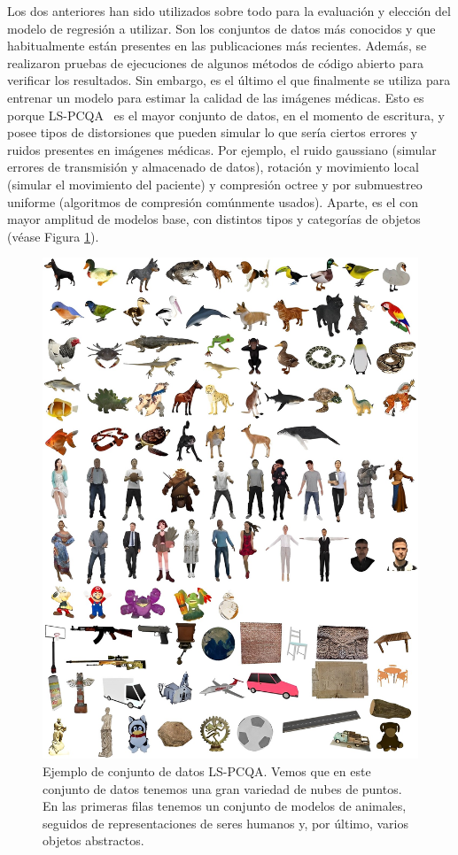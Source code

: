 Los dos anteriores han sido utilizados sobre todo para la evaluación y elección 
del modelo de regresión a utilizar. Son los conjuntos de datos más conocidos 
y que habitualmente están presentes en las publicaciones más recientes. Además, se realizaron 
pruebas de ejecuciones de algunos métodos de código abierto para verificar los 
resultados. Sin embargo, es el último el que finalmente se utiliza para entrenar un modelo para estimar 
la calidad de las imágenes médicas. Esto es porque LS-PCQA~\cite{ResSCNN} 
es el mayor conjunto de datos, en el momento de escritura, y posee tipos de distorsiones que pueden simular 
lo que sería ciertos errores y ruidos presentes en imágenes médicas. Por ejemplo, 
el ruido gaussiano (simular errores de transmisión y almacenado de datos), 
rotación y movimiento local (simular el movimiento del paciente) y compresión 
octree y por submuestreo uniforme (algoritmos de compresión comúnmente usados).
Aparte, es el con mayor amplitud de modelos base, con distintos tipos y categorías 
de objetos (véase Figura \ref{fig:LS-PCQA}).

\begin{figure}[htp]
  \begin{center}
    \includegraphics[width=\textwidth]{imagenes/chapter4/LSPCQA}
  \end{center}
  \caption{Ejemplo de conjunto de datos LS-PCQA.
  Vemos que en este conjunto de datos tenemos una gran variedad de nubes 
de puntos. 
En las primeras filas tenemos un conjunto de modelos de animales, 
seguidos de representaciones de seres humanos y, por último, 
varios objetos abstractos.}
  \label{fig:LS-PCQA}
\end{figure}

